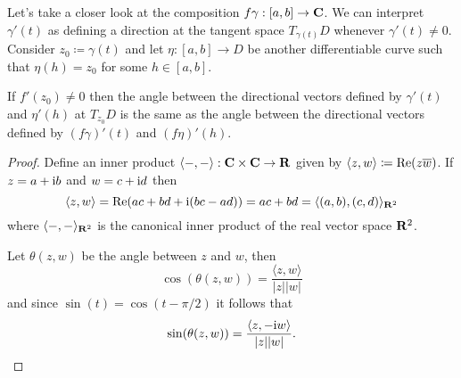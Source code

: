 Let's take a closer look at the composition \(f \gamma: [a, b] \to \mathbf{C}\). We can interpret
\(\gamma'(t)\) as defining a direction at the tangent space \(T_{\gamma(t)}D\) whenever 
\(\gamma'(t) \neq 0\). Consider \(z_0 \coloneq \gamma(t)\) and let \(\eta: [a, b] \to D\) be
another differentiable curve such that \(\eta(h) = z_0\) for some \(h \in [a, b]\).

\begin{theorem}
\label{thm:holomorphic-fn-is-conformal}
    If \(f'(z_0) \neq 0\) then the angle between the directional vectors defined by \(\gamma'(t)\)
    and \(\eta'(h)\) at \(T_{z_0}D\) is the same as the angle between the directional vectors
    defined by \((f \gamma)'(t)\) and \((f \eta)'(h)\).
\end{theorem}

\begin{proof}
   Define an inner product \(\langle -, - \rangle: \mathbf{C} \times \mathbf{C} \to \mathbf{R}\) given by 
   \(\langle z, w \rangle \coloneq \operatorname{Re}(z \overline w)\). If \(z = a + \text{i} b\) and
   \(w = c + \text{i} d\) then 
   \[
       \langle z, w \rangle = \operatorname{Re}(a c + b d + \text{i} (b c - a d))
                            = a c + b d
                            = \langle (a, b), (c, d) \rangle_{\mathbf{R}^2}
   \]
   where \(\langle -, - \rangle_{\mathbf{R}^2}\) is the canonical inner product of the real vector space
   \(\mathbf{R}^2\).

   Let \(\theta(z, w)\) be the angle between \(z\) and \(w\), then
   \[
       \cos(\theta(z, w)) = \frac{\langle z, w \rangle}{|z| |w|}
   \]
   and since \(\sin(t) = \cos(t - \pi/2)\) it follows that
   \[
       \sin(\theta(z, w)) = \frac{\langle z, -\text{i} w \rangle}{|z| |w|}.
   \]
\end{proof}

